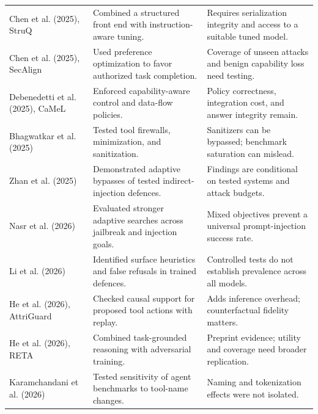 \begin{table}[!t]
\begin{tabularx}{\textwidth}{@{}>{\raggedright\arraybackslash}p{}YY@{}}
Chen et al. (2025), StruQ \cite{chen2025struq} & Combined a structured front end with instruction-aware tuning. & Requires serialization integrity and access to a suitable tuned model. \\
Chen et al. (2025), SecAlign \cite{chen2025secalign} & Used preference optimization to favor authorized task completion. & Coverage of unseen attacks and benign capability loss need testing. \\
Debenedetti et al. (2025), CaMeL \cite{debenedetti2025camel} & Enforced capability-aware control and data-flow policies. & Policy correctness, integration cost, and answer integrity remain. \\
Bhagwatkar et al. (2025) \cite{bhagwatkar2025firewalls} & Tested tool firewalls, minimization, and sanitization. & Sanitizers can be bypassed; benchmark saturation can mislead. \\
Zhan et al. (2025) \cite{zhan2025adaptive} & Demonstrated adaptive bypasses of tested indirect-injection defences. & Findings are conditional on tested systems and attack budgets. \\
Nasr et al. (2026) \cite{nasr2026attacker} & Evaluated stronger adaptive searches across jailbreak and injection goals. & Mixed objectives prevent a universal prompt-injection success rate. \\
Li et al. (2026) \cite{li2026heuristics} & Identified surface heuristics and false refusals in trained defences. & Controlled tests do not establish prevalence across all models. \\
He et al. (2026), AttriGuard \cite{he2026attriguard} & Checked causal support for proposed tool actions with replay. & Adds inference overhead; counterfactual fidelity matters. \\
He et al. (2026), RETA \cite{he2026reta} & Combined task-grounded reasoning with adversarial training. & Preprint evidence; utility and coverage need broader replication. \\
Karamchandani et al. (2026) \cite{karamchandani2026tprs} & Tested sensitivity of agent benchmarks to tool-name changes. & Naming and tokenization effects were not isolated. \\
\hline
\end{tabularx}
\end{table}
